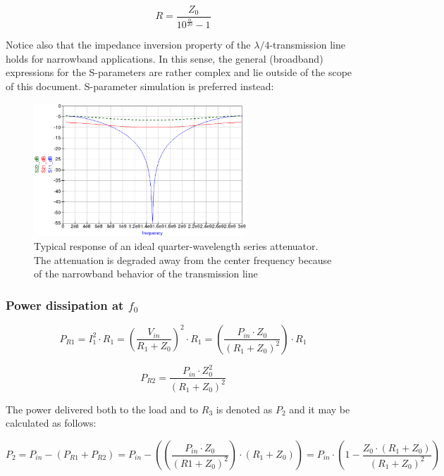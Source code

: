 \begin{equation}
R = \dfrac{Z_0}{10^{\frac{\alpha}{20}}-1}
\end{equation}


\noindent Notice also that the impedance inversion property of the $\lambda/4$-transmission line holds for narrowband applications. In this sense, the general (broadband) expressions for the S-parameters are rather complex and lie outside of the scope of this document. S-parameter simulation is preferred instead:

\begin{figure}[ht]
\begin{center}
\includegraphics[width=8cm]{bitmaps/synthesis/attenuators/qw-series-typical-response}
\end{center}
\caption{Typical response of an ideal quarter-wavelength series attenuator. The attenuation is degraded away from the center frequency because of the narrowband behavior of the transmission line}
\label{fig:qw-series-att-response}
\end{figure}
\FloatBarrier



\subsubsection{Power dissipation at $f_0$}

\begin{equation}
P_{R1} = I_1^2 \cdot R_1 = \left( \dfrac{V_{in}}{R_1 + Z_0} \right)^2 \cdot R_1 = \left( \dfrac{P_{in} \cdot Z_0}{(R_1 + Z_0)^2} \right) \cdot R_1
\end{equation}


\begin{equation}
P_{R2} = \dfrac{P_{in} \cdot Z_0^2}{(R_1 + Z_0)^2}
\end{equation}

\noindent The power delivered both to the load and to $R_3$ is denoted as $P_2$ and it may be calculated as follows:

\begin{equation}
P_2 = P_{in} - (P_{R1} + P_{R2}) = P_{in} - \left( \left( \dfrac{P_{in} \cdot Z_0}{(R1 + Z_0)^2} \right) \cdot \left( R_1 + Z_0\right) \right) = P_{in} \cdot \left( 1 - \dfrac{Z_0 \cdot (R_1 + Z_0)}{(R_1 + Z_0)^2} \right)
\end{equation}


